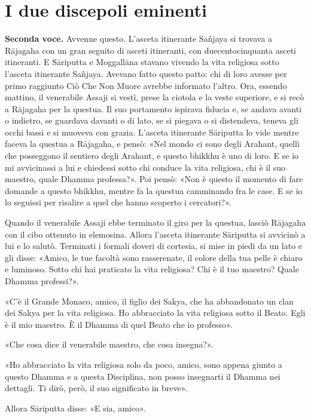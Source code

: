 \chapter{I due discepoli eminenti}

\textbf{Seconda voce.} Avvenne questo. L’asceta itinerante Sañjaya si trovava a
Rājagaha con un gran seguito di asceti itineranti, con duecentocinquanta
asceti itineranti. E Sāriputta e Moggallāna stavano vivendo la vita
religiosa sotto l’asceta itinerante Sañjaya. Avevano fatto questo patto:
chi di loro avesse per primo raggiunto Ciò Che Non Muore avrebbe
informato l’altro. Ora, essendo mattino, il venerabile Assaji si vestì,
prese la ciotola e la veste superiore, e si recò a Rājagaha per la
questua. Il suo portamento ispirava fiducia e, se andava avanti o
indietro, se guardava davanti o di lato, se si piegava o si distendeva,
teneva gli occhi bassi e si muoveva con grazia. L’asceta itinerante
Sāriputta lo vide mentre faceva la questua a Rājagaha, e pensò: «Nel
mondo ci sono degli Arahant, quelli che posseggono il sentiero degli
Arahant, e questo bhikkhu è uno di loro. E se io mi avvicinassi a lui e
chiedessi sotto chi conduce la vita religiosa, chi è il suo maestro,
quale Dhamma professa?». Poi pensò: «Non è questo il momento di fare
domande a questo bhikkhu, mentre fa la questua camminando fra le case. E
se io lo seguissi per risalire a quel che hanno scoperto i cercatori?».


Quando il venerabile Assaji ebbe terminato il giro per la questua,
lasciò Rājagaha con il cibo ottenuto in elemosina. Allora l’asceta
itinerante Sāriputta si avvicinò a lui e lo salutò. Terminati i formali
doveri di cortesia, si mise in piedi da un lato e gli disse: «Amico, le
tue facoltà sono rasserenate, il colore della tua pelle è chiaro e
luminoso. Sotto chi hai praticato la vita religiosa? Chi è il tuo
maestro? Quale Dhamma professi?».


«C’è il Grande Monaco, amico, il figlio dei Sakya, che ha abbandonato un
clan dei Sakya per la vita religiosa. Ho abbracciato la vita religiosa
sotto il Beato. Egli è il mio maestro. È il Dhamma di quel Beato che io
professo».


«Che cosa dice il venerabile maestro, che cosa insegna?».


«Ho abbracciato la vita religiosa solo da poco, amico, sono appena
giunto a questo Dhamma e a questa Disciplina, non posso insegnarti il
Dhamma nei dettagli. Ti dirò, però, il suo significato in breve».


Allora Sāriputta disse: «E sia, amico».


